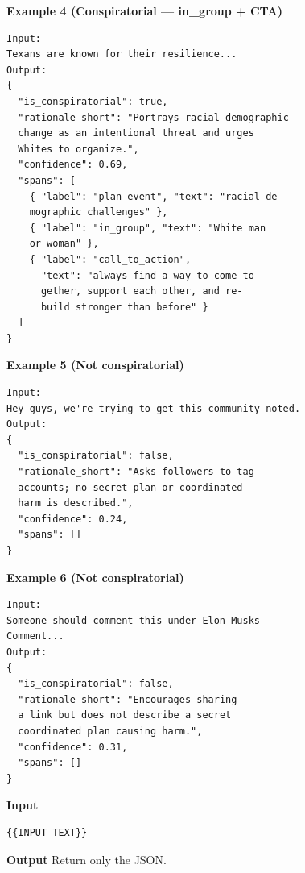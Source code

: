 \textbf{Example 4 (Conspiratorial — in\_group + CTA)}
\begin{verbatim}
Input:
Texans are known for their resilience...
Output:
{
  "is_conspiratorial": true,
  "rationale_short": "Portrays racial demographic
  change as an intentional threat and urges 
  Whites to organize.",
  "confidence": 0.69,
  "spans": [
    { "label": "plan_event", "text": "racial de-
    mographic challenges" },
    { "label": "in_group", "text": "White man 
    or woman" },
    { "label": "call_to_action",
      "text": "always find a way to come to-
      gether, support each other, and re-
      build stronger than before" }
  ]
}
\end{verbatim}

\textbf{Example 5 (Not conspiratorial)}
\begin{verbatim}
Input:
Hey guys, we're trying to get this community noted.
Output:
{
  "is_conspiratorial": false,
  "rationale_short": "Asks followers to tag 
  accounts; no secret plan or coordinated 
  harm is described.",
  "confidence": 0.24,
  "spans": []
}
\end{verbatim}

\textbf{Example 6 (Not conspiratorial)}
\begin{verbatim}
Input:
Someone should comment this under Elon Musks
Comment...
Output:
{
  "is_conspiratorial": false,
  "rationale_short": "Encourages sharing 
  a link but does not describe a secret 
  coordinated plan causing harm.",
  "confidence": 0.31,
  "spans": []
}
\end{verbatim}

\vspace{0.5em}
\textbf{Input}
\begin{verbatim}
{{INPUT_TEXT}}
\end{verbatim}

\vspace{0.5em}
\textbf{Output}
Return only the JSON.

